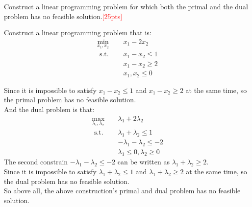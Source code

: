 \documentclass[10pt]{article}
\newenvironment{problem}[2][Problem]{\begin{trivlist}
\item[\hskip \labelsep {\bfseries #1}\hskip \labelsep {\bfseries #2.}]}{\end{trivlist}}
\begin{document}
\newpage


\begin{problem}{4}
    Construct a linear programming problem for which both the primal and the dual problem has no feasible solution.\textcolor{red}{[25pts]}

Construct a linear programming problem that is:\\
\begin{equation}
\begin{aligned}
\min_{x_1,x_2} \quad & x_1-2x_2 \\
\text { s.t. } \quad & x_1 - x_2 \leq 1 \\
& x_1 - x_2 \geq 2 \\
& x_1,x_2 \leq 0
\end{aligned}
\end{equation}

Since it is impossible to satisfy $x_1 - x_2 \leq 1$ and $x_1 - x_2 \geq 2$ at the same time, so the primal problem has no feasible solution.\\
And the dual problem is that:\\
\begin{equation}
\begin{aligned}
\max_{\lambda_1,\lambda_2} \quad & \lambda_1 + 2\lambda_2 \\
\text { s.t. } \quad & \lambda_1 + \lambda_2 \leq 1 \\
& -\lambda_1 - \lambda_2 \leq -2 \\
& \lambda_1\leq 0,\lambda_2 \geq 0
\end{aligned}
\end{equation}
The second constrain $-\lambda_1 - \lambda_2 \leq -2$ can be written as $\lambda_1 + \lambda_2 \geq 2$.\\
Since it is impossible to satisfy $\lambda_1 + \lambda_2 \leq 1$ and $\lambda_1 + \lambda_2 \geq 2$ at the same time, so the dual problem has no feasible solution.\\

So above all, the above construction's primal and dual problem has no feasible solution.\\

\end{problem}
\end{document}
